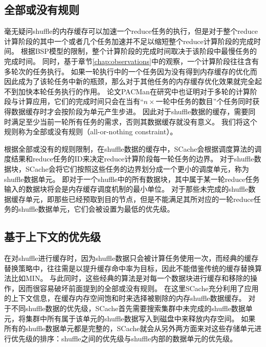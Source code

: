 \subsection{全部或没有规则}

毫无疑问shuffle的内存缓存可以加速一个reduce任务的执行，但是对于整个reduce计算阶段的其中一个或者几个任务加速并不足以缩短整个reduce计算阶段的完成时间。
根据BSP模型的限制，整个计算阶段的完成时间取决于该阶段中最慢任务的完成时间。
同时，基于章节\ref{chap:observations}中的观察，一个计算阶段往往含有多轮次的任务执行。
如果一轮执行中的一个任务因为没有得到内存缓存的优化而因此成为了该轮任务中新的瓶颈，那么对于其他任务的内存缓存优化效果就完全起不到加快本轮任务执行的作用。
论文PACMan\cite{pacman}在研究中也证明对于多轮的计算阶段与计算应用，它们的完成时间只会在当有“$n \times$一轮中任务的数目”个任务同时获得数据缓存时才会按阶段为单元产生步进。
因此对于shuffle数据的缓存，需要同时满足至少当前一轮所有任务的需求，否则其数据缓存就没有意义。
我们将这个规则称为全部或没有规则（all-or-nothing constraint）。

根据全部或没有的规则限制，在shuffle数据的缓存中，SCache会根据调度算法的调度结果和reduce任务的ID来决定reduce计算阶段每一轮任务的边界。
对于shuffle数据块，SCache会将它们按照这些任务的边界划分成一个更小的调度单元，称为shuffle数据单元。
即对于一个shuffle中的所有数据块，其中属于某一轮reduce任务输入的数据块将会是内存缓存调度机制的最小单位。
对于那些未完成的shuffle数据缓存单元，即那些已经预取到目的节点，但是不能满足其所对应的一轮reduce任务的shuffle数据单元，它们会被设置为最低的优先级。


\subsection{基于上下文的优先级}

在对shuffle进行缓存时，因为shuffle数据只会被计算任务使用一次，而经典的缓存替换策略中，往往需是以提升缓存命中率为目标，因此不能借鉴传统的缓存替换算法比如MIN\cite{min}。
与此同时，这些经典的算法是对每一个数据块进行缓存和移除的操作，因而很容易破坏前面提到的全部或没有规则。
在这里SCache充分利用了应用的上下文信息，在缓存内存空间饱和时来选择被剔除的内存shuffle数据缓存。
对于不同shuffle数据的优先级，SCache首先需要搜索集群中未完成的shuffle数据单元，将集群中所有属于该单元的shuffle数据写入到磁盘中来释放内存空间。
如果所有的shuffle数据单元都是完整的，SCache就会从另外两方面来对这些存储单元进行优先级的排序：shuffle之间的优先级与shuffle内部的数据单元的优先级。

